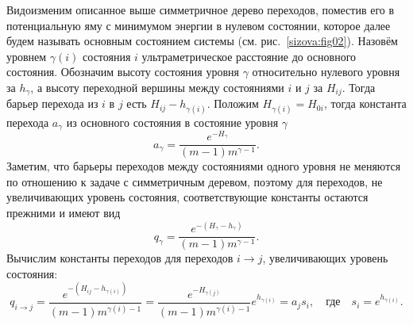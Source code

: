  Видоизменим описанное выше симметричное дерево переходов,
поместив его в потенциальную яму с минимумом энергии в нулевом
состоянии, которое далее будем называть основным состоянием
системы (см. рис.~\ref{sizova:fig02}). Назовём уровнем $\gamma
(i)$ состояния $i$ ультраметрическое расстояние до основного
состояния. Обозначим высоту состояния уровня $\gamma$ относительно
нулевого уровня за $h_\gamma$, а высоту переходной вершины между
состояниями $i$ и $j$ за $H_{ij}$. Тогда барьер перехода из $i$ в
$j$ есть $H_{ij} - h_{\gamma (i)}$. Положим $H_{\gamma (i)} =
H_{0i}$, тогда константа перехода $a_\gamma$ из основного
состояния в состояние уровня $\gamma$ 
$$
a_\gamma = \frac{e^{-H_\gamma}}{(m - 1) m^{\gamma - 1}}.
$$
Заметим, что барьеры переходов между состояниями одного уровня не
меняются по отношению к задаче с симметричным деревом, поэтому для
переходов, не увеличивающих уровень состояния, соответствующие
константы остаются прежними и имеют вид
$$
q_\gamma = \frac{e^{-\left(H_\gamma - h_\gamma\right)}}{\left(m - 1\right) m^{\gamma - 1}}.
$$
Вычислим константы переходов для переходов $i \rightarrow j$,  увеличивающих уровень состояния:
$$
q_{i \rightarrow j} = \frac{e^{-\left(H_{ij} -
h_{\gamma(i)}\right)}}{(m - 1) m^{\gamma (i) - 1}} =
\frac{e^{-H_{\gamma (j)}}}{(m - 1)m^{\gamma (i ) - 1}}
e^{h_{\gamma (i)}} = a_j s_i, \quad \text{где} \quad s_i =
e^{h_{\gamma (i)}}.
$$


